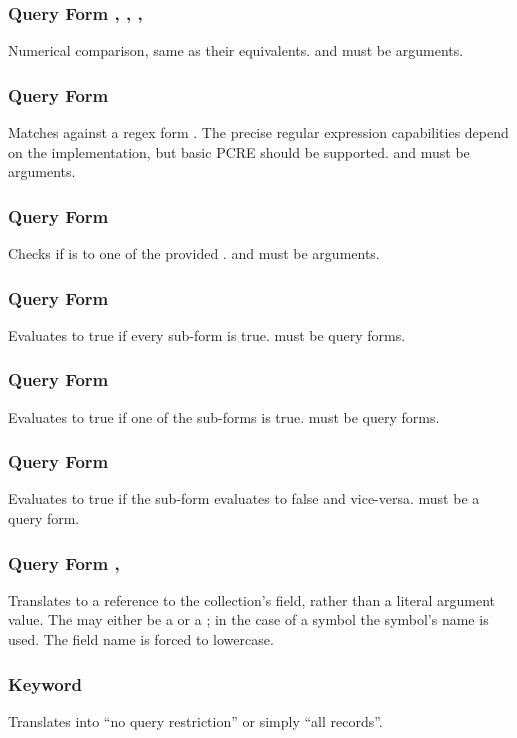 \subsubsection{Query Form \inline{:>}, \inline{:<}, \inline{:<=}, \inline{:>=}}
Numerical comparison, same as their  equivalents.  and  must be arguments.
\subsubsection{Query Form }
Matches  against a regex form . The precise regular expression capabilities depend on the implementation, but basic PCRE should be supported.
 and  must be arguments.
\subsubsection{Query Form }
Checks if  is \inline{=} to one of the provided .
 and  must be arguments.
\subsubsection{Query Form }
Evaluates to true if every sub-form is true.
 must be query forms.
\subsubsection{Query Form }
Evaluates to true if one of the sub-forms is true.
 must be query forms.
\subsubsection{Query Form }
Evaluates to true if the sub-form evaluates to false and vice-versa.
 must be a query form.
\subsubsection{Query Form , }
Translates to a reference to the collection's field, rather than a literal argument value. The  may either be a  or a ; in the case of a symbol the symbol's name is used. The field name is forced to lowercase.
\subsubsection{Keyword }
Translates into ``no query restriction'' or simply ``all records''.

